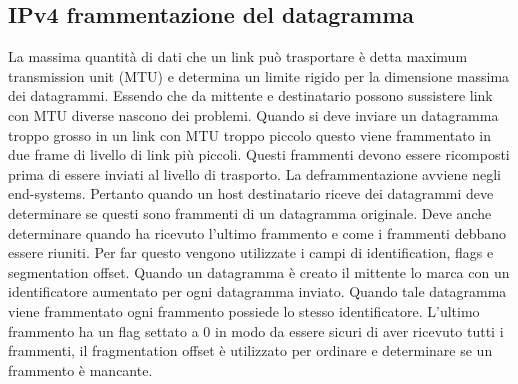 \subsection{IPv4 frammentazione del datagramma}
La massima quantit\`a di dati che un link pu\`o trasportare \`e detta maximum transmission unit (MTU) e determina un limite rigido per la dimensione massima
dei datagrammi. Essendo che da mittente e destinatario possono sussistere link con MTU diverse nascono dei problemi. Quando si deve inviare un datagramma
troppo grosso in un link con MTU troppo piccolo questo viene frammentato in due frame di livello di link pi\`u piccoli. Questi frammenti devono essere 
ricomposti prima di essere inviati al livello di trasporto. La deframmentazione avviene negli end-systems. Pertanto quando un host destinatario riceve dei
datagrammi deve determinare se questi sono frammenti di un datagramma originale. Deve anche determinare quando ha ricevuto l'ultimo frammento e come i 
frammenti debbano essere riuniti. Per far questo vengono utilizzate i campi di identification, flags e segmentation offset. Quando un datagramma \`e creato
il mittente lo marca con un identificatore  aumentato per ogni datagramma inviato. Quando tale datagramma viene frammentato ogni frammento possiede lo 
stesso identificatore. L'ultimo frammento ha un flag settato a 0 in modo da essere sicuri di aver ricevuto tutti i frammenti, il fragmentation offset \`e
utilizzato per ordinare e determinare se un frammento \`e mancante. 

